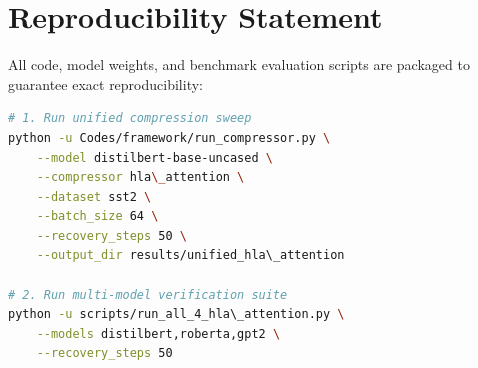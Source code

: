 \section{Reproducibility Statement}
All code, model weights, and benchmark evaluation scripts are packaged to guarantee exact reproducibility:
\begin{lstlisting}[language=bash]
# 1. Run unified compression sweep
python -u Codes/framework/run_compressor.py \
    --model distilbert-base-uncased \
    --compressor hla\_attention \
    --dataset sst2 \
    --batch_size 64 \
    --recovery_steps 50 \
    --output_dir results/unified_hla\_attention

# 2. Run multi-model verification suite
python -u scripts/run_all_4_hla\_attention.py \
    --models distilbert,roberta,gpt2 \
    --recovery_steps 50
\end{lstlisting}
